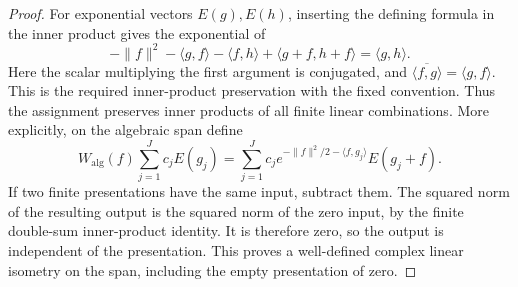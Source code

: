 \documentclass[11pt,a4paper]{article}
\theoremstyle{definition}
\theoremstyle{remark}
\begin{document}
\begin{proof}
For exponential vectors $E(g),E(h)$, inserting the defining formula in
the inner product gives the exponential of
\[
 -\|f\|^2-\langle g,f\rangle-\langle f,h\rangle
                      +\langle g+f,h+f\rangle
       =\langle g,h\rangle.
\]
Here the scalar multiplying the first argument is conjugated, and
$\overline{\langle f,g\rangle}=\langle g,f\rangle$. This is the
required inner-product preservation with the fixed convention.
Thus the assignment preserves inner products of all finite linear
combinations. More explicitly, on the algebraic span define
\[
 W_{\mathrm{alg}}(f)\sum_{j=1}^Jc_jE(g_j)
 =\sum_{j=1}^Jc_j
     e^{-\|f\|^2/2-\langle f,g_j\rangle}E(g_j+f).
\]
If two finite presentations have the same input, subtract them.
The squared norm of the resulting output is the squared norm
of the zero input, by the finite double-sum inner-product
identity. It is therefore zero, so the output is independent
of the presentation. This proves a well-defined complex linear
isometry on the span, including the empty presentation of zero.


\end{proof}
\end{document}
